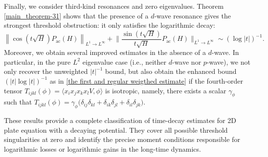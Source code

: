 \documentclass[reqno]{amsart}
\numberwithin{equation}{section}
\begin{document}
Finally, we consider third-kind resonances and zero eigenvalues.
Theorem \ref{main_theorem-31} shows that the presence of a
\(d\)-wave resonance gives the strongest threshold obstruction:
it only satisfies the logarithmic decay:
\begin{equation*}  
    \left\|\cos (t \sqrt{H}) P_{\mathrm{ac}}(H)\right\|_{L^1 \to L^{\infty}} +    
    \bigg\|\frac{\sin (t \sqrt{H})}{t\sqrt{H}} P_{\mathrm{ac}}(H)\bigg\|_{L^1 \to L^{\infty}} \sim ({\log |t|})^{-1}.    
    \end{equation*}
Moreover, we  obtain several improved  estimates in the absence of a $d$-wave. In particular, in the pure $L^2$ eigenvalue case (i.e., neither $d$-wave nor $p$-wave), we not only recover the unweighted $|t|^{-1}$ bound,  but also
obtain the enhanced  bound $(|t|\log|t|)^{-1}$ as in \eqref{the first and regular weigthed estimate} if the fourth-order
tensor
$
T_{ijkl}(\phi)
=
\langle x_ix_jx_kx_lV,\phi\rangle
$
is isotropic,  namely,  there exists a scalar \(\gamma_\phi\) such that
$
T_{ijkl}(\phi)
=
\gamma_\phi
\bigl(
\delta_{ij}\delta_{kl}
+
\delta_{ik}\delta_{jl}
+
\delta_{il}\delta_{jk}
\bigr).
$


These results provide a complete classification of
time-decay estimates for 2D plate equation with a
decaying potential. They cover all possible threshold singularities at zero and identify the precise moment
conditions responsible for logarithmic losses or logarithmic gains
in the long-time dynamics.
\end{document}
